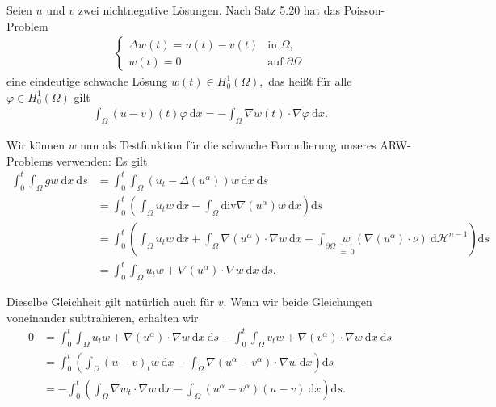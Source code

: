 \begin{solution}

\phantom{}
Seien $u$ und $v$ zwei nichtnegative Lösungen. Nach Satz 5.20 hat das Poisson-Problem
\begin{align}\label{poisson}
\begin{cases}
\Delta w(t) = u(t) - v(t) &\text{in~} \Omega,\\
w(t) = 0 &\text{auf~} \partial\Omega
\end{cases}
\end{align}
eine eindeutige schwache Lösung $w(t) \in H_0^1(\Omega),$ das heißt für alle $\varphi \in H_0^1(\Omega)$ gilt
\begin{align}\label{schwach}
    \int_\Omega (u-v)(t) \varphi \mathrm{~d}x = -\int_\Omega \nabla w(t) \cdot \nabla \varphi \mathrm{~d}x.
\end{align}

Wir können $w$ nun als Testfunktion für die schwache Formulierung unseres ARW-Problems verwenden: Es gilt
\begin{align*}
    \int_0^t \int_\Omega gw \mathrm{~d}x \mathrm{~d}s
    &= \int_0^t \int_\Omega \left(u_t - \Delta(u^\alpha)\right) w \mathrm{~d}x \mathrm{~d}s \\
    &= \int_0^t \left(\int_\Omega u_t w \mathrm{~d}x - \int_\Omega \mathrm{div}\nabla(u^\alpha) w \mathrm{~d}x\right) \mathrm{d}s\\
    &= \int_0^t \left(\int_\Omega u_t w \mathrm{~d}x + \int_\Omega \nabla(u^\alpha) \cdot \nabla w \mathrm{~d}x - \int_{\partial\Omega} \underbrace{w}_{=~0}(\nabla(u^\alpha)\cdot\nu) \mathrm{~d}\mathcal{H}^{n-1}\right) \mathrm{d}s\\
    &= \int_0^t \int_\Omega u_t w + \nabla(u^\alpha) \cdot \nabla w \mathrm{~d}x \mathrm{~d}s.
\end{align*}

Dieselbe Gleichheit gilt natürlich auch für $v.$ Wenn wir beide Gleichungen voneinander subtrahieren, erhalten wir
\begin{align*}
    0 &= \int_0^t \int_\Omega u_t w + \nabla(u^\alpha) \cdot \nabla w \mathrm{~d}x \mathrm{~d}s - \int_0^t \int_\Omega v_t w + \nabla(v^\alpha) \cdot \nabla w \mathrm{~d}x \mathrm{~d}s\\
    &= \int_0^t \left(\int_\Omega (u-v)_t w \mathrm{~d}x - \int_\Omega \nabla(u^\alpha - v^\alpha) \cdot \nabla w \mathrm{~d}x\right) \mathrm{d}s\\
    &= - \int_0^t \left(\int_\Omega \nabla w_t \cdot \nabla w \mathrm{~d}x - \int_\Omega (u^\alpha - v^\alpha) (u-v) \mathrm{~d}x\right)\mathrm{d}s.
\end{align*}


\end{solution}
